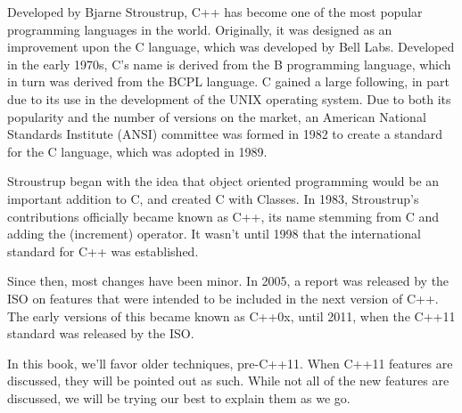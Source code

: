 Developed by Bjarne Stroustrup, C++ has become one of the most popular programming languages in the world. 
Originally, it was designed as an improvement upon the C language, which was developed by Bell Labs. 
Developed in the early 1970s, C's name is derived from the B programming language, which in turn was derived from the BCPL language. 
C gained a large following, in part due to its use in the development of the UNIX operating system. 
Due to both its popularity and the number of versions on the market, an American National Standards Institute (ANSI) committee was formed in 1982 to create a standard for the C language, which was adopted in 1989.

Stroustrup began with the idea that object oriented programming would be an important addition to C, and created C with Classes.
In 1983, Stroustrup's contributions officially became known as C++, its name stemming from C and adding the \Code{++} (increment) operator. 
It wasn't until 1998 that the international standard for C++ was established.

Since then, most changes have been minor. 
In 2005, a report was released by the ISO on features that were intended to be included in the next version of C++. 
The early versions of this became known as C++0x, until 2011, when the C++11 standard was released by the ISO.

In this book, we'll favor older techniques, pre-C++11. 
When C++11 features are discussed, they will be pointed out as such. 
While not all of the new features are discussed, we will be trying our best to explain them as we go.
